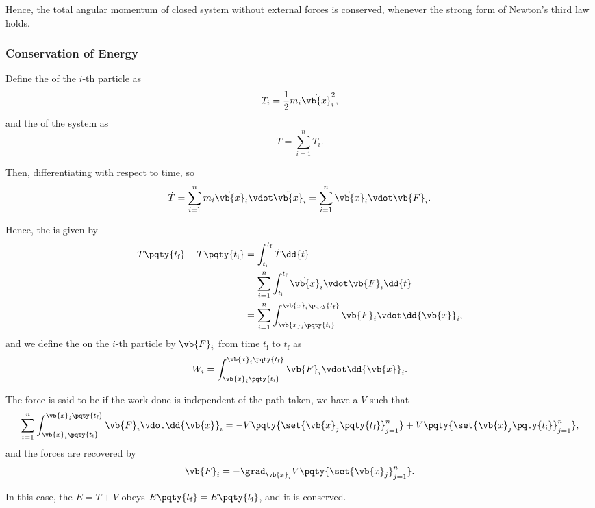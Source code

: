 Hence, the total angular momentum of closed system without external forces is conserved, whenever the strong form of Newton's third law holds.

\subsubsection{Conservation of Energy}

Define the  of the \(i\)-th particle as
\begin{equation}
    T_i = \frac{1}{2} m_i \dot{\vb{x}}_i^2,
\end{equation}
and the  of the system as
\begin{equation}
    T = \sum_{i = 1}^{n} T_i.
\end{equation}

Then, differentiating with respect to time, so
\begin{equation}
    \dot{T} = \sum_{i = 1}^{n} m_i \dot{\vb{x}}_i \vdot \ddot{\vb{x}}_i = \sum_{i = 1}^{n} \dot{\vb{x}}_i \vdot \vb{F}_i.
\end{equation}

Hence, the  is given by
\begin{subequations}
    \begin{align}
        T\pqty{t_\text{f}} - T\pqty{t_\text{i}} &= \int_{t_\text{i}}^{t_\text{f}} \dot{T} \dd{t} \\
        &= \sum_{i = 1}^{n} \int_{t_\text{i}}^{t_\text{f}} \dot{\vb{x}}_i \vdot \vb{F}_i \dd{t} \\
        &= \sum_{i = 1}^{n} \int_{\vb{x}_i\pqty{t_\text{i}}}^{\vb{x}_i\pqty{t_\text{f}}} \vb{F}_i \vdot \dd{\vb{x}}_i,
    \end{align}
\end{subequations}
and we define the  on the \(i\)-th particle by \(\vb{F}_i\) from time \(t_\text{i}\) to \(t_\text{f}\) as
\begin{equation}
    W_i = \int_{\vb{x}_i\pqty{t_\text{i}}}^{\vb{x}_i\pqty{t_\text{f}}} \vb{F}_i \vdot \dd{\vb{x}}_i.
\end{equation}

The force is said to be  if the work done is independent of the path taken, we have a  \(V\) such that
\begin{equation}
    \sum_{i = 1}^{n} \int_{\vb{x}_i\pqty{t_\text{i}}}^{\vb{x}_i\pqty{t_\text{f}}} \vb{F}_i \vdot \dd{\vb{x}}_i = - V \pqty{\set{\vb{x}_j \pqty{t_{\text{f}}}}_{j = 1}^{n}} + V \pqty{\set{\vb{x}_j \pqty{t_{\text{i}}}}_{j = 1}^{n}},
\end{equation}
and the forces are recovered by
\begin{equation}
    \vb{F}_i = - \grad_{\vb{x}_i} V \pqty{\set{\vb{x}_j}_{j = 1}^{n}}.
\end{equation}

In this case, the  \(E = T + V\) obeys \(E \pqty{t_{\text{f}}} = E \pqty{t_{\text{i}}}\), and it is conserved.